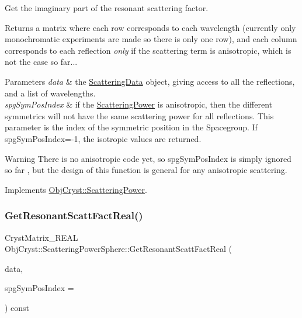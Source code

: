 Get the imaginary part of the resonant scattering factor. 

\begin{DoxyReturn}{Returns}
a matrix where each row corresponds to each wavelength (currently only monochromatic experiments are made so there is only one row), and each column corresponds to each reflection {\itshape only} if the scattering term is anisotropic, which is not the case so far... 
\end{DoxyReturn}

\begin{DoxyParams}{Parameters}
{\em data} & the \mbox{\hyperlink{class_obj_cryst_1_1_scattering_data}{Scattering\+Data}} object, giving access to all the reflections, and a list of wavelengths. \\
\hline
{\em spg\+Sym\+Pos\+Index} & if the \mbox{\hyperlink{class_obj_cryst_1_1_scattering_power}{Scattering\+Power}} is anisotropic, then the different symmetrics will not have the same scattering power for all reflections. This parameter is the index of the symmetric position in the Spacegroup. If spg\+Sym\+Pos\+Index=-\/1, the isotropic values are returned. \\
\hline
\end{DoxyParams}
\begin{DoxyWarning}{Warning}
There is no anisotropic code yet, so spg\+Sym\+Pos\+Index is simply ignored so far , but the design of this function is general for any anisotropic scattering. 
\end{DoxyWarning}


Implements \mbox{\hyperlink{class_obj_cryst_1_1_scattering_power_a9bc5d86bf76116f645b43d46f2a9771c}{Obj\+Cryst\+::\+Scattering\+Power}}.

\mbox{\label{class_obj_cryst_1_1_scattering_power_sphere_ae4bfc8319aa74f69eca021050f8d445d}} 
\subsubsection{\texorpdfstring{GetResonantScattFactReal()}{GetResonantScattFactReal()}}
{\footnotesize\ttfamily Cryst\+Matrix\+\_\+\+R\+E\+AL Obj\+Cryst\+::\+Scattering\+Power\+Sphere\+::\+Get\+Resonant\+Scatt\+Fact\+Real (\begin{DoxyParamCaption}\item[{const \mbox{\hyperlink{class_obj_cryst_1_1_scattering_data}{Scattering\+Data}} \&}]{data,  }\item[{const int}]{spg\+Sym\+Pos\+Index = {} }\end{DoxyParamCaption}) const\hspace{0.3cm}{\ttfamily [virtual]}}



